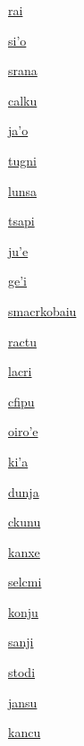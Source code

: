 {\hyperlink{val:rai}{rai}}{}{}{}

{\hyperlink{val:siho}{si'o}}{}{}{}

{\hyperlink{val:srana}{srana}}{}{}{}

{\hyperlink{val:calku}{calku}}{}{}{}

{\hyperlink{val:jaho}{ja'o}}{}{}{}

{\hyperlink{val:tugni}{tugni}}{}{}{}

{\hyperlink{val:lunsa}{lunsa}}{}{}{}

{\hyperlink{val:tsapi}{tsapi}}{}{}{}

{\hyperlink{val:juhe}{ju'e}}{}{}{}

{\hyperlink{val:gehi}{ge'i}}{}{}{}

{\hyperlink{val:smacrkobaiu}{smacrkobaiu}}{}{}{}

{\hyperlink{val:ractu}{ractu}}{}{}{}

{\hyperlink{val:lacri}{lacri}}{}{}{}

{\hyperlink{val:cfipu}{cfipu}}{}{}{}

{\hyperlink{val:oirohe}{oiro'e}}{}{}{}

{\hyperlink{val:kiha}{ki'a}}{}{}{}

{\hyperlink{val:dunja}{dunja}}{}{}{}

{\hyperlink{val:ckunu}{ckunu}}{}{}{}

{\hyperlink{val:kanxe}{kanxe}}{}{}{}

{\hyperlink{val:selcmi}{selcmi}}{}{}{}

{\hyperlink{val:konju}{konju}}{}{}{}

{\hyperlink{val:sanji}{sanji}}{}{}{}

{\hyperlink{val:stodi}{stodi}}{}{}{}

{\hyperlink{val:jansu}{jansu}}{}{}{}

{\hyperlink{val:kancu}{kancu}}{}{}{}

